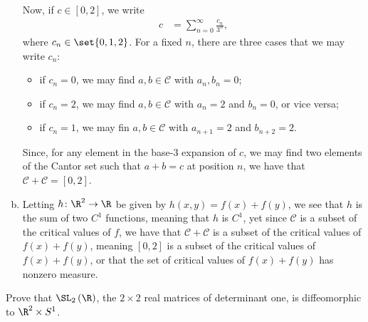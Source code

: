 \documentclass[10pt]{mypackage}
\begin{document}
\begin{solution}
\begin{enumerate}[(a)]
      Now, if $c\in [0,2]$, we write
      \begin{align*}
        c &= \sum_{n=0}^{\infty} \frac{c_n}{3^{n}},
      \end{align*}
      where $c_n\in\set{0,1,2}$. For a fixed $n$, there are three cases that we may write $c_n$:
      \begin{itemize}
        \item if $c_n = 0$, we may find $a,b\in \mathcal{C}$ with $a_n,b_n = 0$;
        \item if $c_n = 2$, we may find $a,b\in \mathcal{C}$ with $a_n = 2$ and $b_n = 0$, or vice versa;
        \item if $c_n = 1$, we may fin $a,b\in \mathcal{C}$ with $a_{n+1} = 2$ and $b_{n+2} = 2$.
      \end{itemize}
      Since, for any element in the base-3 expansion of $c$, we may find two elements of the Cantor set such that $a + b = c$ at position $n$, we have that $\mathcal{C} + \mathcal{C} = [0,2]$.
    \item Letting $h\colon \R^{2}\rightarrow \R$ be given by $h\left( x,y \right) = f\left( x \right) + f\left( y \right)$, we see that $h$ is the sum of two $C^{1}$ functions, meaning that $h$ is $C^{1}$, yet since $\mathcal{C}$ is a subset of the critical values of $f$, we have that $\mathcal{C} + \mathcal{C}$ is a subset of the critical values of $f(x) + f(y)$, meaning $[0,2]$ is a subset of the critical values of $f(x) + f(y)$, or that the set of critical values of $f(x) + f(y)$ has nonzero measure.
  \end{enumerate}
\end{solution}
\begin{problem}[Problem 5]
  Prove that $\SL_2\left( \R \right)$, the $2\times 2$ real matrices of determinant one, is diffeomorphic to $\R^{2}\times S^{1}$.
\end{problem}
\end{document}
